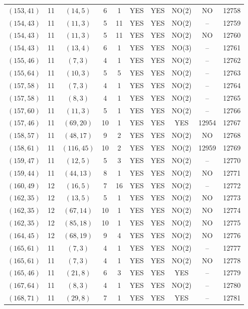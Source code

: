 \begin{longtable}{|c|c|c|c|c|c|c|c|c|c|}
$(153, 41)$ & 11 & $(14, 5)$ & 6 & 1 & YES & YES & NO(2) & NO & 12758\\
$(154, 43)$ & 11 & $(11, 3)$ & 5 & 11 & YES & YES & NO(2) & -- & 12759\\
$(154, 43)$ & 11 & $(11, 3)$ & 5 & 11 & YES & YES & NO(2) & NO & 12760\\
$(154, 43)$ & 11 & $(13, 4)$ & 6 & 1 & YES & YES & NO(3) & -- & 12761\\
$(155, 46)$ & 11 & $(7, 3)$ & 4 & 1 & YES & YES & NO(2) & -- & 12762\\
$(155, 64)$ & 11 & $(10, 3)$ & 5 & 5 & YES & YES & NO(2) & -- & 12763\\
$(157, 58)$ & 11 & $(7, 3)$ & 4 & 1 & YES & YES & NO(2) & -- & 12764\\
$(157, 58)$ & 11 & $(8, 3)$ & 4 & 1 & YES & YES & NO(2) & -- & 12765\\
$(157, 60)$ & 11 & $(11, 3)$ & 5 & 1 & YES & YES & NO(2) & -- & 12766\\
$(157, 46)$ & 11 & $(69, 20)$ & 10 & 1 & YES & YES & YES & 12954 & 12767\\
$(158, 57)$ & 11 & $(48, 17)$ & 9 & 2 & YES & YES & NO(2) & NO & 12768\\
$(158, 61)$ & 11 & $(116, 45)$ & 10 & 2 & YES & YES & NO(2) & 12959 & 12769\\
$(159, 47)$ & 11 & $(12, 5)$ & 5 & 3 & YES & YES & NO(2) & -- & 12770\\
$(159, 44)$ & 11 & $(44, 13)$ & 8 & 1 & YES & YES & NO(2) & NO & 12771\\
$(160, 49)$ & 12 & $(16, 5)$ & 7 & 16 & YES & YES & NO(2) & -- & 12772\\
$(162, 35)$ & 12 & $(13, 5)$ & 5 & 1 & YES & YES & NO(2) & NO & 12773\\
$(162, 35)$ & 12 & $(67, 14)$ & 10 & 1 & YES & YES & NO(2) & NO & 12774\\
$(162, 35)$ & 12 & $(85, 18)$ & 10 & 1 & YES & YES & NO(2) & NO & 12775\\
$(164, 45)$ & 12 & $(68, 19)$ & 9 & 4 & YES & YES & NO(2) & NO & 12776\\
$(165, 61)$ & 11 & $(7, 3)$ & 4 & 1 & YES & YES & NO(2) & -- & 12777\\
$(165, 61)$ & 11 & $(7, 3)$ & 4 & 1 & YES & YES & NO(2) & NO & 12778\\
$(165, 46)$ & 11 & $(21, 8)$ & 6 & 3 & YES & YES & YES & -- & 12779\\
$(167, 64)$ & 11 & $(8, 3)$ & 4 & 1 & YES & YES & NO(2) & -- & 12780\\
$(168, 71)$ & 11 & $(29, 8)$ & 7 & 1 & YES & YES & YES & -- & 12781\\

\end{longtable}
